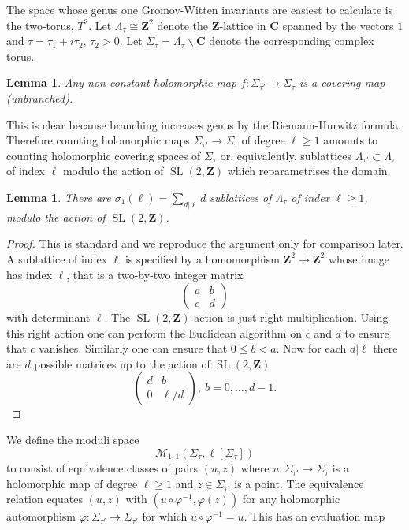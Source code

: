 \documentclass[11pt]{amsart}
\newcommand{\mM}{\mathcal{M}}
\newcommand{\CC}{\mathbf{C}}
\newcommand{\ZZ}{\mathbf{Z}}
\renewcommand{\phi}{\varphi}
\newcommand{\OP}{\operatorname}
\numberwithin{equation}{section}
\newtheorem{lma}[equation]{Lemma}
\theoremstyle{definition}
\theoremstyle{remark}
\begin{document}
The space whose genus one Gromov-Witten invariants are easiest to calculate is the two-torus, $T^2$. Let $\Lambda_{\tau}\cong\ZZ^2$ denote the $\ZZ$-lattice in $\CC$ spanned by the vectors $1$ and $\tau=\tau_1+i\tau_2$, $\tau_2>0$. Let $\Sigma_{\tau}=\Lambda_{\tau}\backslash\CC$ denote the corresponding complex torus.
\begin{lma}
Any non-constant holomorphic map $f\colon \Sigma_{\tau'}\to \Sigma_{\tau}$ is a covering map (unbranched).
\end{lma}
This is clear because branching increases genus by the Riemann-Hurwitz formula. Therefore counting holomorphic maps $\Sigma_{\tau'}\to \Sigma_{\tau}$ of degree $\ell\geq 1$ amounts to counting holomorphic covering spaces of $\Sigma_{\tau}$ or, equivalently, sublattices $\Lambda_{\tau'}\subset\Lambda_{\tau}$ of index $\ell$ modulo the action of $\OP{SL}(2,\ZZ)$ which re\-pa\-ra\-metri\-ses the domain.
\begin{lma}
There are $\sigma_1(\ell)=\sum_{d|\ell}d$ sublattices of $\Lambda_{\tau}$ of index $\ell\geq 1$, modulo the action of $\OP{SL}(2,\ZZ)$.
\end{lma}
\begin{proof}
This is standard and we reproduce the argument only for comparison later. A sublattice of index $\ell$ is specified by a homomorphism $\ZZ^2\to\ZZ^2$ whose image has index $\ell$, that is a two-by-two integer matrix
\[\left(\begin{array}{cc}
a & b\\
c & d
\end{array}\right)\]
with determinant $\ell$. The $\OP{SL}(2,\ZZ)$-action is just right multiplication. Using this right action one can perform the Euclidean algorithm on $c$ and $d$ to ensure that $c$ vanishes. Similarly one can ensure that $0\leq b< a$. Now for each $d|\ell$ there are $d$ possible matrices up to the action of $\OP{SL}(2,\ZZ)$
\[\left(\begin{array}{cc}
d & b\\
0 & \ell/d
\end{array}\right),\ b=0,\ldots,d-1.\]
\end{proof}
We define the moduli space
\[\mM_{1,1}(\Sigma_{\tau},\ell[\Sigma_{\tau}])\]
to consist of equivalence classes of pairs $(u,z)$ where $u\colon\Sigma_{\tau'}\to\Sigma_{\tau}$ is a holomorphic map of degree $\ell\geq 1$ and $z\in\Sigma_{\tau'}$ is a point. The equivalence relation equates $(u,z)$ with $(u\circ\phi^{-1},\phi(z))$ for any holomorphic automorphism $\phi\colon\Sigma_{\tau'}\to\Sigma_{\tau'}$ for which $u\circ\phi^{-1}=u$. This has an evaluation map
\end{document}

